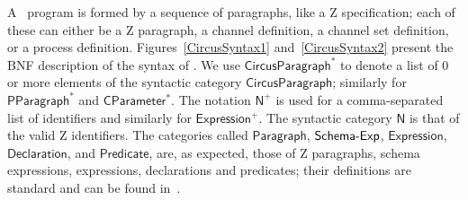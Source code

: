 \documentclass{article}
\begin{document}
A \Circus\ program is formed by a sequence of paragraphs, like a Z
specification; each of these can either be a Z paragraph, a channel
definition, a channel set definition, or a process definition.
Figures~\ref{CircusSyntax1} and~\ref{CircusSyntax2} present the BNF
description of the syntax of \Circus.  We use
$\mathsf{CircusParagraph^*}$ to denote a list of 0 or more elements of
the syntactic category $\mathsf{CircusParagraph}$; similarly for
$\mathsf{PParagraph^*}$ and $\mathsf{CParameter^*}$.  The notation
$\mathsf{N^+}$ is used for a comma-separated list of identifiers and
similarly for $\mathsf{Expression^+}$.  The syntactic category
$\mathsf{N}$ is that of the valid Z identifiers.  The categories
called $\mathsf{Paragraph}$, $\mathsf{Schema\hbox{-}Exp}$,
$\mathsf{Expression}$, $\mathsf{Declaration}$, and
$\mathsf{Predicate}$, are, as expected, those of Z paragraphs, schema
expressions, expressions, declarations and predicates; their
definitions are standard and can be found in~\cite{Spi92}.
\end{document}
